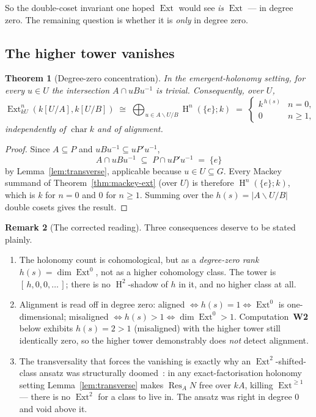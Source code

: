 \documentclass[11pt]{amsart}
\theoremstyle{plain}
\newtheorem{theorem}{Theorem}
\theoremstyle{definition}
\newtheorem{remark}[theorem]{Remark}
\DeclareMathOperator{\Res}{Res}
\DeclareMathOperator{\Ext}{Ext}
\DeclareMathOperator{\Hh}{H}
\newcommand{\dcoset}[3]{#1\backslash #2/#3}
\begin{document}
So the double-coset invariant one hoped $\Ext$ would see \emph{is} $\Ext$ --- in degree
zero. The remaining question is whether it is \emph{only} in degree zero.

\subsection{The higher tower vanishes}
\begin{theorem}[Degree-zero concentration]\label{thm:tower-vanishes}
In the emergent-holonomy setting, for every $u\in U$ the intersection $A\cap uBu^{-1}$ is
trivial. Consequently, over $U$,
\[
   \Ext^n_{kU}(k[U/A],k[U/B])\;\cong\;
   \bigoplus_{u\in\dcoset{A}{U}{B}}\Hh^n(\{e\};k)
   \;=\;
   \begin{cases} k^{\,h(s)} & n=0,\\[2pt] 0 & n\ge 1,\end{cases}
\]
independently of $\operatorname{char}k$ and of alignment.
\end{theorem}
\begin{proof}
Since $A\subseteq P$ and $uBu^{-1}\subseteq uP'u^{-1}$,
\[
   A\cap uBu^{-1}\;\subseteq\;P\cap uP'u^{-1}\;=\;\{e\}
\]
by Lemma~\ref{lem:transverse}, applicable because $u\in U\subseteq G$. Every Mackey
summand of Theorem~\ref{thm:mackey-ext} (over $U$) is therefore $\Hh^n(\{e\};k)$, which is
$k$ for $n=0$ and $0$ for $n\ge 1$. Summing over the $h(s)=\lvert\dcoset{A}{U}{B}\rvert$
double cosets gives the result.
\end{proof}

\begin{remark}[The corrected reading]\label{rem:reading}
Three consequences deserve to be stated plainly.
\begin{enumerate}
\item[(i)] The holonomy count is cohomological, but as a \emph{degree-zero rank}
   $h(s)=\dim\Ext^0$, not as a higher cohomology class. The tower is $[\,h,0,0,\dots\,]$;
   there is no $\Hh^2$-shadow of $h$ in it, and no higher class at all.
\item[(ii)] Alignment is read off in degree zero: aligned $\iff h(s)=1\iff\Ext^0$ is
   one-dimensional; misaligned $\iff h(s)>1\iff \dim\Ext^0>1$. Computation~\textbf{W2}
   below exhibits $h(s)=2>1$ (misaligned) with the higher tower still identically zero, so
   the higher tower demonstrably does \emph{not} detect alignment.
\item[(iii)] The transversality that forces the vanishing is exactly why an
   $\Ext^2$-shifted-class ansatz was structurally doomed~\cite{macbeth-rickv4}: in any
   exact-factorisation holonomy setting Lemma~\ref{lem:transverse} makes $\Res_A N$ free
   over $kA$, killing $\Ext^{\ge 1}$ --- there is no $\Ext^2$ for a class to live in. The
   ansatz was right in degree $0$ and void above it.
\end{enumerate}
\end{remark}
\end{document}
